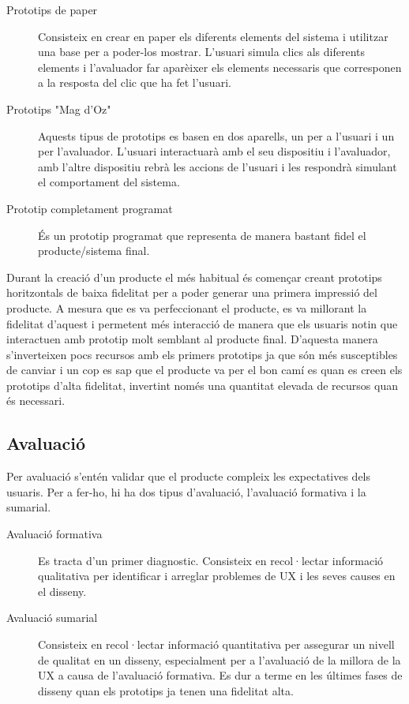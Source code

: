\begin{description}
\item[Prototips de paper] Consisteix en crear en paper els diferents elements del sistema i utilitzar una base per a poder-los mostrar. L'usuari simula clics als diferents elements i l'avaluador far aparèixer els elements necessaris que corresponen a la resposta del clic que ha fet l'usuari. 
\item[Prototips "Mag d'Oz"] Aquests tipus de prototips es basen en dos aparells, un per a l'usuari i un per l'avaluador. L'usuari interactuarà amb el seu dispositiu i l'avaluador, amb l'altre dispositiu rebrà les accions de l'usuari i les respondrà simulant el comportament del sistema.
\item[Prototip completament programat] És un prototip programat que representa de manera bastant fidel el producte/sistema final.
\end{description}

Durant la creació d'un producte el més habitual és començar creant prototips horitzontals de baixa fidelitat per a poder generar una primera impressió del producte. A mesura que es va perfeccionant el producte, es va millorant la fidelitat d'aquest i permetent més interacció de manera que els usuaris notin que interactuen amb prototip molt semblant al producte final. D'aquesta manera s'inverteixen pocs recursos amb els primers prototips ja que són més susceptibles de canviar i un cop es sap que el producte va per el bon camí es quan es creen els prototips d'alta fidelitat, invertint només una quantitat elevada de recursos quan és necessari. 

\subsection{Avaluació}
Per avaluació s'entén validar que el producte compleix les expectatives dels usuaris. Per a fer-ho, hi ha dos tipus d'avaluació, l'avaluació formativa i la sumarial. 

\begin{description}
\item[Avaluació formativa] Es tracta d'un primer diagnostic. Consisteix en recol·lectar informació qualitativa per identificar i arreglar problemes de \ac{UX} i les seves causes en el disseny.
\item[Avaluació sumarial] Consisteix en recol·lectar informació quantitativa per assegurar un nivell de qualitat en un disseny, especialment per a l'avaluació de la millora de la \ac{UX} a causa de l'avaluació formativa. Es dur a terme en les últimes fases de disseny quan els prototips ja tenen una fidelitat alta. 
\end{description}

